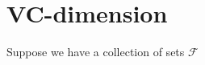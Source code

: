 \documentclass{amsart}
\begin{document}
\section{VC-dimension}

Suppose we have a collection of sets $\mathcal{F}$
\end{document}
